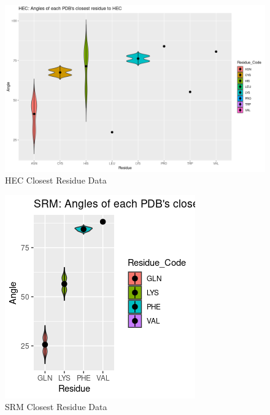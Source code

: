 	\begin{figure}
		\caption{HEC Closest Residue Data}
		\label{figs:HEC_closestRes7}
		\includegraphics[width=\linewidth]{7A/HEC_closestRes}
	\end{figure}
	
	
	\begin{figure}
		\caption{SRM Closest Residue Data}
		\label{figs:SRM_closestRes7}
		\includegraphics[width=\linewidth]{7A/SRM_closestRes}
	\end{figure}


